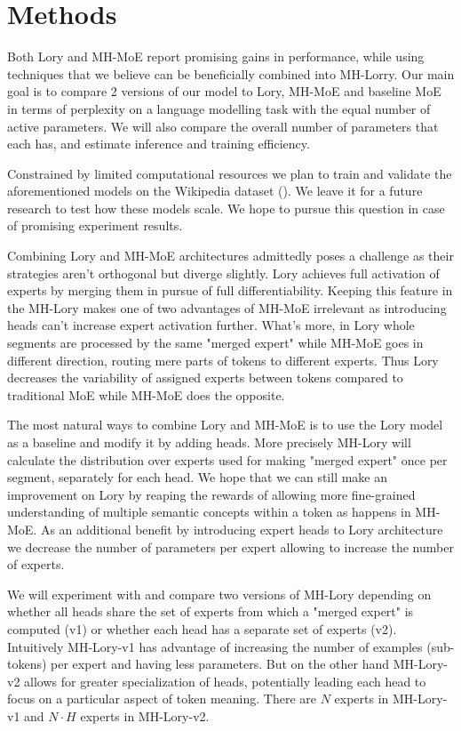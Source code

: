 \documentclass[12pt]{article}
\begin{document}
\section{Methods}
Both Lory and MH-MoE report promising gains in performance, while using techniques that we believe can be beneficially combined into MH-Lorry. Our main goal is to compare 2 versions of our model to Lory, MH-MoE and baseline MoE in terms of perplexity on a language modelling task with the equal number of active parameters. We will also compare the overall number of parameters that each has, and estimate inference and training efficiency. 

Constrained by limited computational resources we plan to train and validate the aforementioned models on the Wikipedia dataset (\cite{wikidump}). We leave it for a future research to test how these models scale. We hope to pursue this question in case of promising experiment results.

Combining Lory and MH-MoE architectures admittedly poses a challenge as their strategies aren't orthogonal but diverge slightly. Lory achieves full activation of experts by merging them in pursue of full differentiability. Keeping this feature in the MH-Lory makes one of two advantages of MH-MoE irrelevant as introducing heads can't increase expert activation further. What's more, in Lory whole segments are processed by the same "merged expert" while MH-MoE goes in different direction, routing mere parts of tokens to different experts. Thus Lory decreases the variability of assigned experts between tokens compared to traditional MoE while MH-MoE does the opposite.

The most natural ways to combine Lory and MH-MoE is to use the Lory model as a baseline and modify it by adding heads. More precisely MH-Lory will calculate the distribution over experts used for making "merged expert" once per segment, separately for each head. We hope that we can still make an improvement on Lory by reaping the rewards of allowing more fine-grained understanding of multiple semantic concepts within a token as happens in MH-MoE. As an additional benefit by introducing expert heads to Lory architecture we decrease the number of parameters per expert allowing to increase the number of experts.

We will experiment with and compare two versions of MH-Lory depending on whether all heads share the set of experts from which a "merged expert" is computed (v1) or whether each head has a separate set of experts (v2). Intuitively MH-Lory-v1 has advantage of increasing the number of examples (sub-tokens) per expert and having less parameters. But on the other hand MH-Lory-v2 allows for greater specialization of heads, potentially leading each head to focus on a particular aspect of token meaning. There are $N$ experts in MH-Lory-v1 and $N \cdot H$ experts in MH-Lory-v2.
\end{document}
